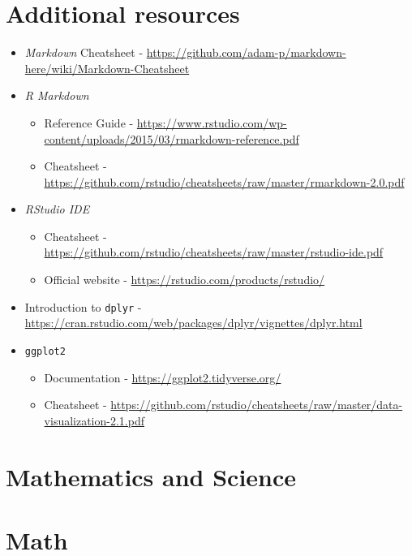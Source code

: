 \documentclass[12pt,twoside]{book}
\providecommand{\tightlist}{%
  \setlength{\itemsep}{0pt}\setlength{\parskip}{0pt}}
\begin{document}
\section{Additional resources}\label{additional-resources}

\begin{itemize}
\item
  \emph{Markdown} Cheatsheet - \url{https://github.com/adam-p/markdown-here/wiki/Markdown-Cheatsheet}
\item
  \emph{R Markdown}

  \begin{itemize}
  \tightlist
  \item
    Reference Guide - \url{https://www.rstudio.com/wp-content/uploads/2015/03/rmarkdown-reference.pdf}
  \item
    Cheatsheet - \url{https://github.com/rstudio/cheatsheets/raw/master/rmarkdown-2.0.pdf}
  \end{itemize}
\item
  \emph{RStudio IDE}

  \begin{itemize}
  \tightlist
  \item
    Cheatsheet - \url{https://github.com/rstudio/cheatsheets/raw/master/rstudio-ide.pdf}
  \item
    Official website - \url{https://rstudio.com/products/rstudio/}
  \end{itemize}
\item
  Introduction to \texttt{dplyr} - \url{https://cran.rstudio.com/web/packages/dplyr/vignettes/dplyr.html}
\item
  \texttt{ggplot2}

  \begin{itemize}
  \tightlist
  \item
    Documentation - \url{https://ggplot2.tidyverse.org/}
  \item
    Cheatsheet - \url{https://github.com/rstudio/cheatsheets/raw/master/data-visualization-2.1.pdf}
  \end{itemize}
\end{itemize}

\section{Mathematics and Science}\label{math-sci}

\section{Math}\label{math}
\end{document}
